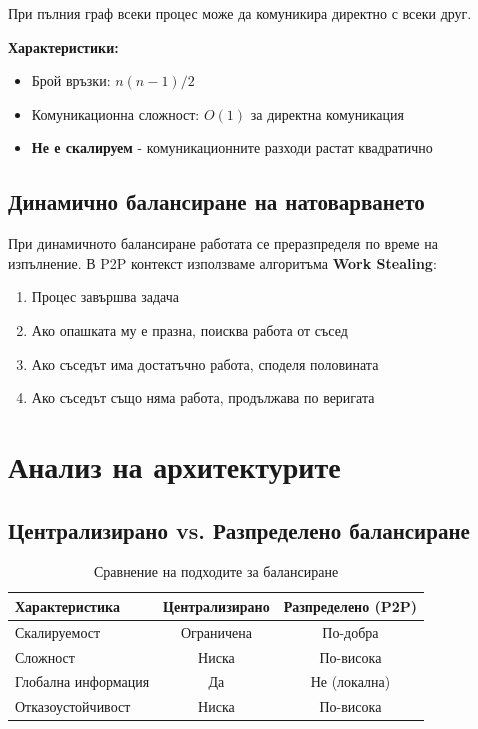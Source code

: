 \documentclass[12pt,a4paper]{article}
\begin{document}
При пълния граф всеки процес може да комуникира директно с всеки друг.

\textbf{Характеристики:}
\begin{itemize}
    \item Брой връзки: $n(n-1)/2$
    \item Комуникационна сложност: $O(1)$ за директна комуникация
    \item \textbf{Не е скалируем} - комуникационните разходи растат квадратично
\end{itemize}

\subsection{Динамично балансиране на натоварването}

При динамичното балансиране работата се преразпределя по време на изпълнение. В P2P контекст използваме алгоритъма \textbf{Work Stealing}:

\begin{enumerate}
    \item Процес завършва задача
    \item Ако опашката му е празна, поисква работа от съсед
    \item Ако съседът има достатъчно работа, споделя половината
    \item Ако съседът също няма работа, продължава по веригата
\end{enumerate}

\section{Анализ на архитектурите}

\subsection{Централизирано vs. Разпределено балансиране}

\begin{table}[H]
\centering
\begin{tabular}{lcc}
\toprule
\textbf{Характеристика} & \textbf{Централизирано} & \textbf{Разпределено (P2P)} \\
\midrule
Скалируемост & Ограничена & По-добра \\
Сложност & Ниска & По-висока \\
Глобална информация & Да & Не (локална) \\
Отказоустойчивост & Ниска & По-висока \\
\bottomrule
\end{tabular}
\caption{Сравнение на подходите за балансиране}
\end{table}
\end{document}

